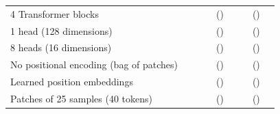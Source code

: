 \begin{tabular}{lrrcccccc}
4 Transformer blocks & \transformerAttnLayersLayersFour{} & \transformerAttnTokensLayersFour{} & \transformerAttnDistFirstLayersFour{} & \transformerAttnDistLastLayersFour{} (\transformerAttnDistUniformLayersFour{}) & \transformerAttnQentropyFirstLayersFour{} & \transformerAttnQentropyLastLayersFour{} & \transformerAttnDiagLastLayersFour{} (\transformerAttnUniformLayersFour{}) & \transformerAttnRecvEntropyLastLayersFour{} \\
1 head (128 dimensions) & \transformerAttnLayersHeadsOne{} & \transformerAttnTokensHeadsOne{} & \transformerAttnDistFirstHeadsOne{} & \transformerAttnDistLastHeadsOne{} (\transformerAttnDistUniformHeadsOne{}) & \transformerAttnQentropyFirstHeadsOne{} & \transformerAttnQentropyLastHeadsOne{} & \transformerAttnDiagLastHeadsOne{} (\transformerAttnUniformHeadsOne{}) & \transformerAttnRecvEntropyLastHeadsOne{} \\
8 heads (16 dimensions) & \transformerAttnLayersHeadsEight{} & \transformerAttnTokensHeadsEight{} & \transformerAttnDistFirstHeadsEight{} & \transformerAttnDistLastHeadsEight{} (\transformerAttnDistUniformHeadsEight{}) & \transformerAttnQentropyFirstHeadsEight{} & \transformerAttnQentropyLastHeadsEight{} & \transformerAttnDiagLastHeadsEight{} (\transformerAttnUniformHeadsEight{}) & \transformerAttnRecvEntropyLastHeadsEight{} \\
No positional encoding (bag of patches) & \transformerAttnLayersNoPos{} & \transformerAttnTokensNoPos{} & \transformerAttnDistFirstNoPos{} & \transformerAttnDistLastNoPos{} (\transformerAttnDistUniformNoPos{}) & \transformerAttnQentropyFirstNoPos{} & \transformerAttnQentropyLastNoPos{} & \transformerAttnDiagLastNoPos{} (\transformerAttnUniformNoPos{}) & \transformerAttnRecvEntropyLastNoPos{} \\
Learned position embeddings & \transformerAttnLayersLearnedPos{} & \transformerAttnTokensLearnedPos{} & \transformerAttnDistFirstLearnedPos{} & \transformerAttnDistLastLearnedPos{} (\transformerAttnDistUniformLearnedPos{}) & \transformerAttnQentropyFirstLearnedPos{} & \transformerAttnQentropyLastLearnedPos{} & \transformerAttnDiagLastLearnedPos{} (\transformerAttnUniformLearnedPos{}) & \transformerAttnRecvEntropyLastLearnedPos{} \\
Patches of 25 samples (40 tokens) & \transformerAttnLayersPatchTwoFive{} & \transformerAttnTokensPatchTwoFive{} & \transformerAttnDistFirstPatchTwoFive{} & \transformerAttnDistLastPatchTwoFive{} (\transformerAttnDistUniformPatchTwoFive{}) & \transformerAttnQentropyFirstPatchTwoFive{} & \transformerAttnQentropyLastPatchTwoFive{} & \transformerAttnDiagLastPatchTwoFive{} (\transformerAttnUniformPatchTwoFive{}) & \transformerAttnRecvEntropyLastPatchTwoFive{} \\

\end{tabular}

